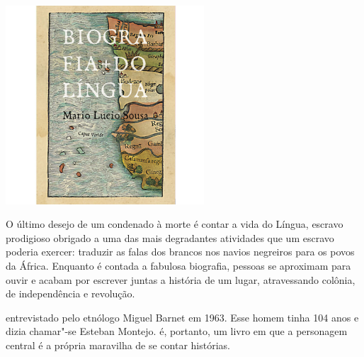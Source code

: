 \pagebreak %


\begin{center}
\hspace*{.5cm}\includegraphics[width=74mm]{./grid/lingua.jpg}
\end{center}

\hspace*{-7cm}\hrulefill\hspace*{-7cm}

\medskip

\noindent{}O último desejo de um condenado à morte é contar a vida do Língua, escravo prodigioso obrigado a uma das mais degradantes atividades que um escravo poderia exercer: traduzir as falas dos brancos nos navios negreiros para os povos da África. Enquanto é contada a fabulosa biografia, pessoas se aproximam para ouvir e acabam por escrever juntas a história de um lugar, atravessando colônia, de independência e revolução.

 entrevistado pelo etnólogo Miguel Barnet em 1963. Esse homem tinha 104 anos e dizia chamar"-se Esteban Montejo. {} é, portanto, um livro em que a personagem central é a própria maravilha de se contar histórias.

\vfill

\hspace*{-.4cm}\begin{minipage}[c]{.5\linewidth}
\small{
{}}
\end{minipage}

